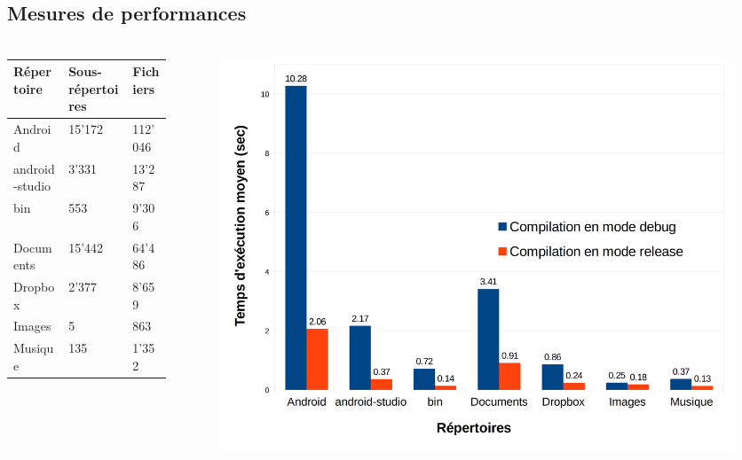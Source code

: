 \documentclass[10pt]{beamer}
\begin{document}
\subsection{Mesures de performances}
\begin{frame}
    \frametitle{\subsecname}
    \begin{columns}[T]
        \begin{column}{.35\textwidth}
        \fontsize{6pt}{8}\selectfont
            \begin{tabularx}{4cm}{|p{1cm}|p{1cm}|X|} \hline
                \textbf{Répertoire} & \textbf{Sous-répertoires} & \textbf{Fichiers} \\ \hline
                Android & 15'172 & 112'046 \\ \hline
                android-studio & 3'331 & 13'287 \\ \hline
                bin & 553 & 9'306 \\ \hline
                Documents & 15'442 & 64'486 \\ \hline
                Dropbox & 2'377 & 8'659 \\ \hline
                Images & 5 & 863 \\ \hline
                Musique & 135 & 1'352 \\ \hline
            \end{tabularx}
        \end{column}
        \pause
        \begin{column}{.65\textwidth}
            \begin{center}
                \begin{figure}
                    \includegraphics[width=1\textwidth]{images/histo.png}
                \end{figure}
            \end{center}
        \end{column}
    \end{columns}
\end{frame}
\end{document}
